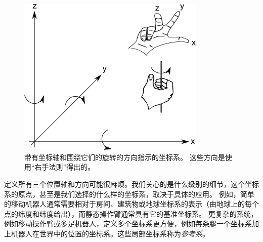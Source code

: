 \begin{figure}
	\centering
		\includegraphics[width=0.8\textwidth]{figs/coordinatesystem}
	\caption{带有坐标轴和围绕它们的旋转的方向指示的坐标系。 这些方向是使用“右手法则”得出的。}
	\label{fig:coordinatesystem}
\end{figure}


定义所有三个位置轴和方向可能很麻烦。我们关心的是什么级别的细节，这个坐标系的原点，甚至是我们选择的什么样的坐标系，取决于具体的应用。 例如，简单的移动机器人通常需要相对于房间、建筑物或地球坐标系的表示（由地球上的每个点的纬度和纬度给出），而静态操作臂通常具有它的基准坐标系。 更复杂的系统，例如移动操作臂或多足机器人，定义多个坐标系更方便，例如每条腿一个坐标系加上机器人在世界中的位置的坐标系。这些局部坐标系称为\emph{参考系}。


